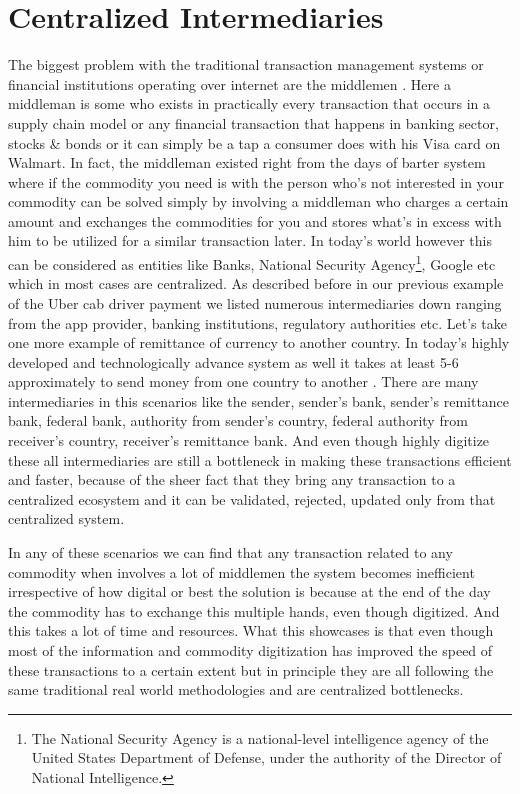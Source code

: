 \section{Centralized Intermediaries}
The biggest problem with the traditional transaction management systems or financial institutions operating over internet are the middlemen \cite{torres10}. Here a middleman is some who exists in practically every transaction that occurs in a supply chain model or any financial transaction that happens in banking sector, stocks \& bonds or it can simply be a tap a consumer does with his Visa card on Walmart. In fact, the middleman existed right from the days of barter system where if the commodity you need is with the person who's not interested in your commodity can be solved simply by involving a middleman who charges a certain amount and exchanges the commodities for you and stores what's in excess with him to be utilized for a similar transaction later. In today's world however this can be considered as entities like Banks, National Security Agency\footnote{The National Security Agency is a national-level intelligence agency of the United States Department of Defense, under the authority of the Director of National Intelligence.}, Google etc which in most cases are centralized. As described before in our previous example of the Uber cab driver payment we listed numerous intermediaries down ranging from the app provider, banking institutions, regulatory authorities etc. Let's take one more example of remittance of currency to another country. In today's highly developed and technologically advance system as well it takes at least 5-6 approximately to send money from one country to another \cite{martinez11}. There are many intermediaries in this scenarios like the sender, sender's bank, sender's remittance bank, federal bank, authority from sender's country, federal authority from receiver's country, receiver's remittance bank. And even though highly digitize these all intermediaries are still a bottleneck in making these transactions efficient and faster, because of the sheer fact that they bring any transaction to a centralized ecosystem and it can be validated, rejected, updated only from that centralized system.

In any of these scenarios we can find that any transaction related to any commodity when involves a lot of middlemen the system becomes inefficient irrespective of how digital or best the solution is because at the end of the day the commodity has to exchange this multiple hands, even though digitized. And this takes a lot of time and resources. What this showcases is that even though most of the information and commodity digitization has improved the speed of these transactions to a certain extent but in principle they are all following the same traditional real world methodologies and are centralized bottlenecks.


